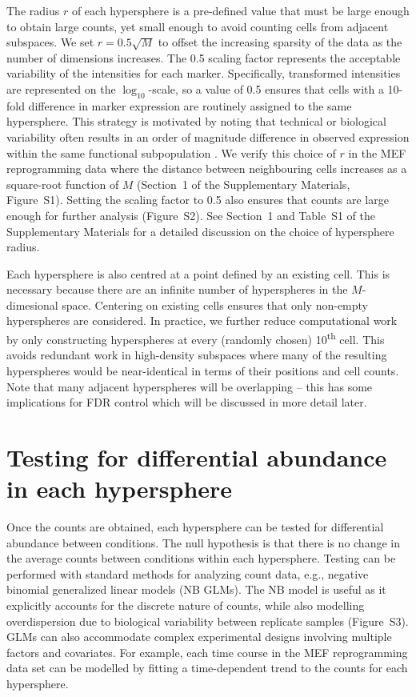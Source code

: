 \documentclass{article}
\newcommand{\supphyperradverify}{1}
\newcommand{\suppfighyperrad}{S1}
\newcommand{\suppfighypertol}{S2}
\newcommand{\suppfignbdisp}{S3}
\newcommand{\supptabparam}{S1}
\begin{document}
The radius $r$ of each hypersphere is a pre-defined value that must be large enough to obtain large counts, yet small enough to avoid counting cells from adjacent subspaces.
We set $r=0.5\sqrt{M}$ to offset the increasing sparsity of the data as the number of dimensions increases.
The 0.5 scaling factor represents the acceptable variability of the intensities for each marker.
Specifically, transformed intensities are represented on the $\log_{10}$-scale, so a value of 0.5 ensures that cells with a 10-fold difference in marker expression are routinely assigned to the same hypersphere.
This strategy is motivated by noting that technical or biological variability often results in an order of magnitude difference in observed expression within the same functional subpopulation \cite{ornatsky2008study,zunder2015continuous,zunder2015palladium}.
We verify this choice of $r$ in the MEF reprogramming data where the distance between neighbouring cells increases as a square-root function of $M$ (Section~\supphyperradverify{} of the Supplementary Materials, Figure~\suppfighyperrad{}).
Setting the scaling factor to 0.5 also ensures that counts are large enough for further analysis (Figure~\suppfighypertol{}).
See Section~\supphyperradverify{} and Table~\supptabparam{} of the Supplementary Materials for a detailed discussion on the choice of hypersphere radius.

Each hypersphere is also centred at a point defined by an existing cell.
This is necessary because there are an infinite number of hyperspheres in the $M$-dimesional space.
Centering on existing cells ensures that only non-empty hyperspheres are considered.
In practice, we further reduce computational work by only constructing hyperspheres at every (randomly chosen) 10\textsuperscript{th} cell.
This avoids redundant work in high-density subspaces where many of the resulting hyperspheres would be near-identical in terms of their positions and cell counts.
Note that many adjacent hyperspheres will be overlapping -- this has some implications for FDR control which will be discussed in more detail later.

\section{Testing for differential abundance in each hypersphere}
Once the counts are obtained, each hypersphere can be tested for differential abundance between conditions.
The null hypothesis is that there is no change in the average counts between conditions within each hypersphere.
Testing can be performed with standard methods for analyzing count data, e.g., negative binomial generalized linear models (NB GLMs).
The NB model is useful as it explicitly accounts for the discrete nature of counts, while also modelling overdispersion due to biological variability between replicate samples (Figure~\suppfignbdisp{}).
GLMs can also accommodate complex experimental designs involving multiple factors and covariates.
For example, each time course in the MEF reprogramming data set can be modelled by fitting a time-dependent trend to the counts for each hypersphere.
\end{document}
